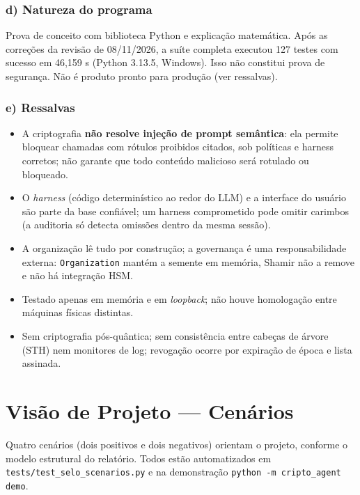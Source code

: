 \documentclass[11pt,a4paper]{article}
\theoremstyle{plain}
\theoremstyle{definition}
\theoremstyle{remark}
\newcommand{\cod}[1]{\texttt{#1}}
\begin{document}
\subsubsection*{d) Natureza do programa}
Prova de conceito com biblioteca Python e explicação matemática. Após as correções da revisão de 08/11/2026, a suíte completa executou 127 testes com sucesso em 46,159 s (Python 3.13.5, Windows). Isso não constitui prova de segurança. Não é produto pronto para produção (ver ressalvas).

\subsubsection*{e) Ressalvas}
\begin{itemize}
  \item A criptografia \textbf{não resolve injeção de prompt semântica}: ela permite bloquear chamadas com rótulos proibidos citados, sob políticas e harness corretos; não garante que todo conteúdo malicioso será rotulado ou bloqueado.
  \item O \emph{harness} (código determinístico ao redor do LLM) e a interface do usuário são parte da base confiável; um harness comprometido pode omitir carimbos (a auditoria só detecta omissões dentro da mesma sessão).
  \item A organização lê tudo por construção; a governança é uma responsabilidade externa: \cod{Organization} mantém a semente em memória, Shamir não a remove e não há integração HSM.
  \item Testado apenas em memória e em \emph{loopback}; não houve homologação entre máquinas físicas distintas.
  \item Sem criptografia pós-quântica; sem consistência entre cabeças de árvore (STH) nem monitores de log; revogação ocorre por expiração de época e lista assinada.
\end{itemize}

\section{Visão de Projeto --- Cenários}

Quatro cenários (dois positivos e dois negativos) orientam o projeto, conforme o modelo estrutural do relatório. Todos estão automatizados em \cod{tests/test\_selo\_scenarios.py} e na demonstração \cod{python -m cripto\_agent demo}.
\end{document}
